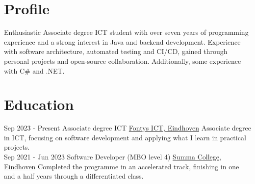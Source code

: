 \documentclass[letterpaper]{twentysecondcv_english}
\begin{document}
    \makesidebarFirst



    \section{Profile}

    Enthusiastic Associate degree ICT student with over seven years of
    programming experience and a strong interest in Java and backend development.
    Experience with software architecture, automated testing and CI/CD,
    gained through personal projects and open-source collaboration.
    Additionally, some experience with C\# and .NET.

    \vspace{6mm}



    \section{Education}

    \begin{twenty}

        \twentyitem
        {Sep 2023 -}
        {Present}
        {Associate degree ICT}
        {\href{https://www.fontys.nl/}{Fontys ICT, Eindhoven}}
        {}
        {
            Associate degree in ICT, focusing on software development
        and applying what I learn in practical projects.
        } \\

        \twentyitem
        {Sep 2021 -}
        {Jun 2023}
        {Software Developer (MBO level 4)}
        {\href{https://www.summacollege.nl/}{Summa College, Eindhoven}}
        {}
        {
            Completed the programme in an accelerated track,
            finishing in one and a half years through a differentiated class.
        }

    \end{twenty}

\end{document}
